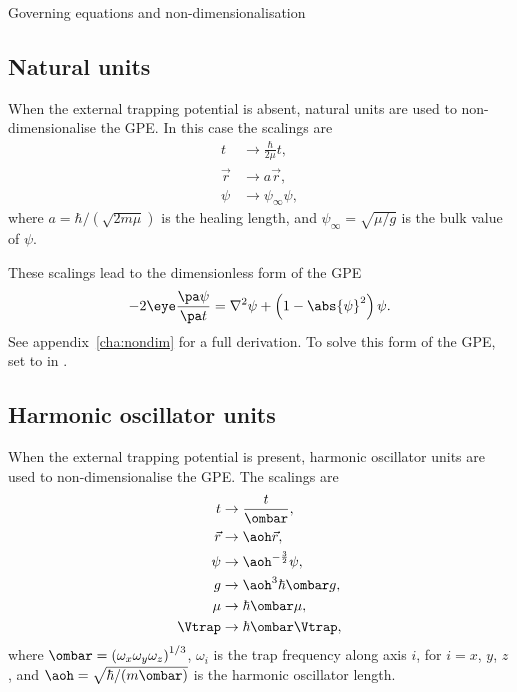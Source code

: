 \begin{chapter}{\label{cha:equations}Governing equations and
  non-dimensionalisation}
  \subsection{Natural units}
  When the external trapping potential is absent, natural units are used to
  non-dimensionalise the GPE.  In this case the scalings are
  \begin{equation}
    \begin{aligned}
      t       &\to \frac{\hbar}{2\mu}t, \\
      \vec{r} &\to a\vec{r}, \\
      \psi    &\to \psi_{\infty} \psi,
    \end{aligned}
    \label{eqn:natural_scalings}
  \end{equation}
  where $a = \hbar/(\sqrt{2m\mu})$ is the healing length, and $\psi_{\infty} =
  \sqrt{\mu/g}$ is the bulk value of $\psi$.

  These scalings lead to the dimensionless form of the GPE
  \begin{equation*}
    -2\eye\frac{\pa \psi}{\pa t} = \nabla^{2}\psi + \left(1 -
    \abs{\psi}^{2}\right)\psi.
  \end{equation*}
  See appendix~\ref{cha:nondim} for a full derivation.  To solve this form of
  the GPE, set  to  in .

  \subsection{Harmonic oscillator units}
  When the external trapping potential is present, harmonic oscillator units
  are used to non-dimensionalise the GPE.  The scalings are
  \begin{equation}
    \begin{aligned}
      t       &\to \frac{t}{\ombar}, \\
      \vec{r} &\to \aoh\vec{r}, \\
      \psi    &\to \aoh^{-\frac{3}{2}} \psi, \\
      g       &\to \aoh^{3}\hbar\ombar g, \\
      \mu     &\to \hbar\ombar\mu, \\
      \Vtrap  &\to \hbar\ombar\Vtrap,
    \end{aligned}
    \label{eqn:ho_scalings}
  \end{equation}
  where $\ombar = \left( \omega_{x}\omega_{y}\omega_{z}
  \right)^{1/3}$, $\omega_{i}$ is the trap frequency along axis $i$, for $i =
  x$, $y$, $z$, and $\aoh = \sqrt{\hbar/(m\ombar)}$ is the
  harmonic oscillator length.


\end{chapter}
